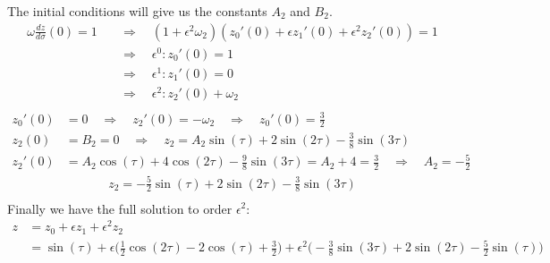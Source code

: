 \documentclass[a4paper,10pt]{article}
\begin{document}
The initial conditions will give us the constants $A_2$ and $B_2$.
\begin{align*}
\omega \frac{dz}{d \sigma}(0) = 1 \quad &\Rightarrow \quad (1+\epsilon^2 \omega_2)(z_0'(0) + \epsilon z_1'(0) + \epsilon^2 z_2'(0)) = 1  \\[2mm]
&\Rightarrow  \quad \epsilon^0 : z_0'(0) = 1  \\[2mm]
&\Rightarrow  \quad \epsilon^1 : z_1'(0) = 0  \\[2mm]
&\Rightarrow  \quad \epsilon^2 : z_2'(0) + \omega_2 \\ 
\end{align*}
\newpage
\begin{align*}
z_0'(0) &= 0 \quad \Rightarrow \quad z_2'(0) = -\omega_2 \quad \Rightarrow \quad z_0'(0) = \frac{3}{2} \\
z_2(0) &= B_2 = 0 \quad \Rightarrow \quad z_2 = A_2 \sin(\tau) + 2 \sin(2 \tau) - \frac{3}{8} \sin(3 \tau) \\ 
z_2'(0) &= A_2 \cos(\tau) + 4 \cos(2 \tau) - \frac{9}{8} \sin(3 \tau) = A_2 + 4 = \frac{3}{2} \quad \Rightarrow \quad A_2 = -\frac{5}{2} 
\end{align*}
\begin{align}
z_2 = -\frac{5}{2} \sin(\tau) + 2 \sin(2 \tau) - \frac{3}{8} \sin(3 \tau) \\ \nonumber
\end{align}
Finally we have the full solution to order $\epsilon^2$:
\begin{align}
z &= z_0 + \epsilon z_1 + \epsilon^2 z_2 \nonumber\\[0.7em]
&= \sin(\tau) + \epsilon \bigg( \frac{1}{2} \cos(2 \tau) - 2 \cos(\tau) + \frac{3}{2}\bigg) + \epsilon^2 \bigg(-\frac{3}{8} \sin(3 \tau) + 2 \sin(2 \tau) -\frac{5}{2} \sin(\tau)\bigg) \label{final_solution}
\end{align}
\end{document}

